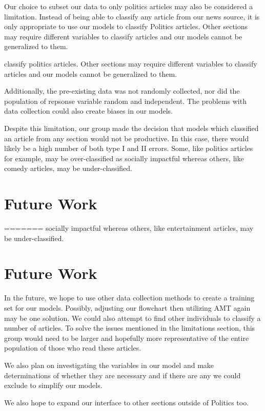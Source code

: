\documentclass[10pt,letterpaper]{article}
\begin{document}
Our choice to subset our data to only politics articles may also be
considered a limitation. Instead of being able to classify any article
from our news source, it is only appropriate to use our models to
classify Politics articles. Other sections may require different
variables to classify articles and our models cannot be generalized to
them.

classify politics articles. Other sections may require different
variables to classify articles and our models cannot be generalized to
them.

Additionally, the pre-existing data was not randomly collected, nor did
the population of repsonse variable random and independent. The problems
with data collection could also create biases in our models.

Despite this limitation, our group made the decision that models which
classified an article from any section would not be productive. In this
case, there would likely be a high number of both type I and II errors.
Some, like politics articles for example, may be over-classified as
socially impactful whereas others, like comedy articles, may be
under-classified.

\section{Future Work}\label{future-work}
=======
socially impactful whereas others, like entertainment articles, may be
under-classified.

\hypertarget{future-work}{%
\section{Future Work}\label{future-work}}

In the future, we hope to use other data collection methods to create a
training set for our models. Possibly, adjusting our flowchart then
utilizing AMT again may be one solution. We could also attempt to find
other individuals to classify a number of articles. To solve the issues
mentioned in the limitations section, this group would need to be larger
and hopefully more representative of the entire population of those who
read these articles.

We also plan on investigating the variables in our model and make
determinations of whether they are necessary and if there are any we
could exclude to simplify our models.

We also hope to expand our interface to other sections outside of
Politics too.
\end{document}

